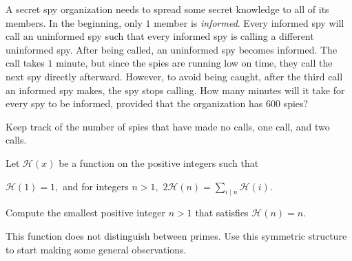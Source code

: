 \documentclass{article}
\begin{document}
\begin{exam}
A secret spy organization needs to spread some secret knowledge to all of its members. In the beginning, only $1$ member is \textit{informed}. Every informed spy will call an uninformed spy such that every informed spy is calling a different uninformed spy. After being called, an uninformed spy becomes informed. The call takes $1$ minute, but since the spies are running low on time, they call the next spy directly afterward. However, to avoid being caught, after the third call an informed spy makes, the spy stops calling. How many minutes will it take for every spy to be informed, provided that the organization has $600$ spies?
\end{exam}

\begin{walk}
Keep track of the number of spies that have made no calls, one call, and two calls.
\end{walk}

\begin{exam}[NARML/9]
Let $\mathcal{H}(x)$ be a function on the positive integers such that
\begin{itemize}
\Item $\mathcal{H}(1)=1,$ and
\Item for integers $n>1,$ $2\mathcal{H}(n)=\sum\limits_{i\mid n}\mathcal{H}(i).$
\end{itemize}
Compute the smallest positive integer $n>1$ that satisfies $\mathcal{H}(n)=n.$
\end{exam}
\begin{walk}
This function does not distinguish between primes. Use this symmetric structure to start making some general observations.
\end{walk}
\end{document}
